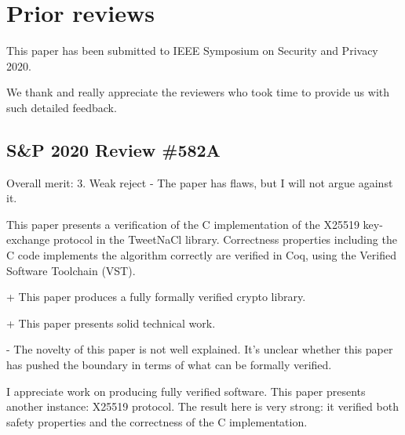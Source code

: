 \section{Prior reviews}
\label{appendix:past-reviews}

This paper has been submitted to IEEE Symposium on Security and Privacy 2020.

We thank and really appreciate the reviewers who took time to provide us with
such detailed feedback.

\subsection{S\&P 2020 Review \#582A}

Overall merit: 3. Weak reject - The paper has flaws, but I will not argue against it.


\begin{center}
\end{center}

This paper presents a verification of the C implementation of the X25519
key-exchange protocol in the TweetNaCl library.  Correctness properties
including the C code implements the algorithm correctly are verified in Coq,
using the Verified Software Toolchain (VST).


\begin{center}
\end{center}

+ This paper produces a fully formally verified crypto library.

+ This paper presents solid technical work.


\begin{center}
\end{center}

- The novelty of this paper is not well explained. It's unclear whether this
paper has pushed the boundary in terms of what can be formally verified.


\begin{center}
\end{center}

I appreciate work on producing fully verified software. This paper presents
another instance: X25519 protocol. The result here is very strong: it verified
both safety properties and the correctness of the C implementation.


